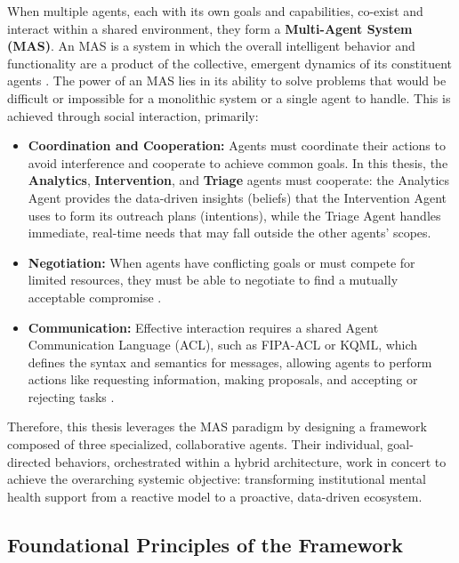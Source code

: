 When multiple agents, each with its own goals and capabilities, co-exist and interact within a shared environment, they form a \textbf{Multi-Agent System (MAS)}. An MAS is a system in which the overall intelligent behavior and functionality are a product of the collective, emergent dynamics of its constituent agents \cite{FIND_CITATION_PLEASE}. The power of an MAS lies in its ability to solve problems that would be difficult or impossible for a monolithic system or a single agent to handle. This is achieved through social interaction, primarily:
\begin{itemize}
    \item \textbf{Coordination and Cooperation:} Agents must coordinate their actions to avoid interference and cooperate to achieve common goals. In this thesis, the \textbf{Analytics}, \textbf{Intervention}, and \textbf{Triage} agents must cooperate: the Analytics Agent provides the data-driven insights (beliefs) that the Intervention Agent uses to form its outreach plans (intentions), while the Triage Agent handles immediate, real-time needs that may fall outside the other agents' scopes.
    \item \textbf{Negotiation:} When agents have conflicting goals or must compete for limited resources, they must be able to negotiate to find a mutually acceptable compromise \cite{FIND_CITATION_PLEASE}.
    \item \textbf{Communication:} Effective interaction requires a shared Agent Communication Language (ACL), such as FIPA-ACL or KQML, which defines the syntax and semantics for messages, allowing agents to perform actions like requesting information, making proposals, and accepting or rejecting tasks \cite{FIND_CITATION_PLEASE}.
\end{itemize}
Therefore, this thesis leverages the MAS paradigm by designing a framework composed of three specialized, collaborative agents. Their individual, goal-directed behaviors, orchestrated within a hybrid architecture, work in concert to achieve the overarching systemic objective: transforming institutional mental health support from a reactive model to a proactive, data-driven ecosystem.

\subsection{Foundational Principles of the Framework}
\label{subsec:foundational_principles}

